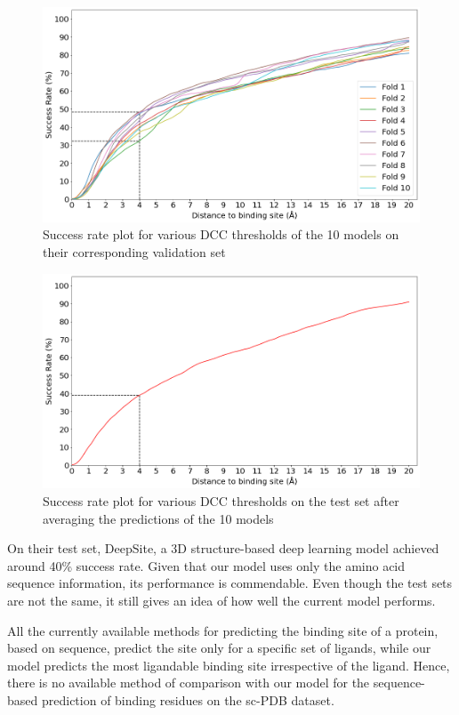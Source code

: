 \documentclass[journal=jacsat,manuscript=article]{achemso}
\begin{document}
\begin{figure}
    \centering
    \noindent\includegraphics[scale=0.45]{valid_dcc.png}
    \caption{\centering Success rate plot for various DCC thresholds of the 10 models on their corresponding validation set}
    \label{fig:valid_dcc}
\end{figure}

\begin{figure}
    \centering
    \noindent\includegraphics[scale=0.45]{test_dcc.png}
    \caption{\centering Success rate plot for various DCC thresholds on the test set after averaging the predictions of the 10 models}
    \label{fig:test_dcc}
\end{figure}

On their test set, DeepSite, a 3D structure-based deep learning model \cite{jimenez2017deepsite} achieved around 40\% success rate. Given that our model uses only the amino acid sequence information, its performance is commendable. Even though the test sets are not the same, it still gives an idea of how well the current model performs.

All the currently available methods for predicting the binding site of a protein, based on sequence, predict the site only for a specific set of ligands, while our model predicts the most ligandable binding site irrespective of the ligand. Hence, there is no available method of comparison with our model for the sequence-based prediction of binding residues on the sc-PDB\cite{desaphy2015sc} dataset.
\end{document}
